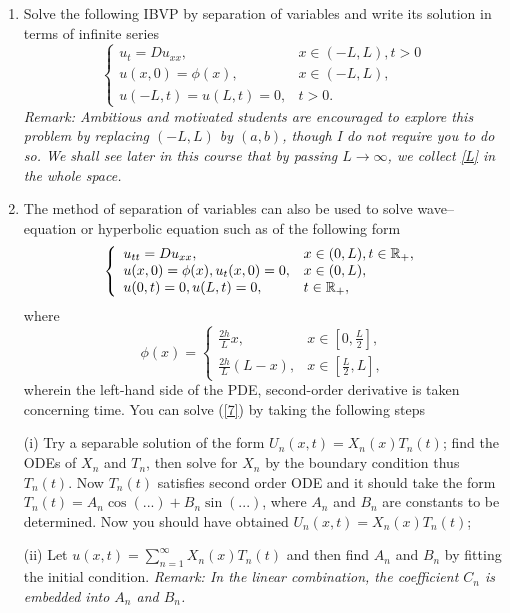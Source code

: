 \documentclass[6pt]{article}
\numberwithin{equation}{section}
\def\mathbb{\Bbb}
\begin{document}
\begin{enumerate}
\item Solve the following IBVP by separation of variables and write its solution in terms of infinite series
\begin{equation}\label{L}
\left\{
\begin{array}{ll}
u_t=Du_{xx},& x\in(-L,L),t>0\\
u(x,0)=\phi(x),&x\in(-L,L),\\
u(-L,t)=u(L,t)=0, &t>0.
\end{array}
\right.
\end{equation}
\emph{Remark:  Ambitious and motivated students are encouraged to explore this problem by replacing $(-L,L)$ by $(a,b)$, though I do not require you to do so.  We shall see later in this course that by passing $L\rightarrow\infty$, we collect \eqref{L} in the whole space.}

\item  The method of separation of variables can also be used to solve wave--equation or hyperbolic equation such as of the following form
\begin{equation}\label{7}
\left\{
\begin{array}{ll}
u_{tt}=Du_{xx},& x\in(0,L),t\in \mathbb R_+,\\
u(x,0)=\phi(x), u_t(x,0)=0, &x\in(0,L),\\
u(0,t)=0, u(L,t)=0, &t\in \mathbb R_+,
\end{array}
\right.
\end{equation}
where
\[\phi(x)=
\left\{
\begin{array}{ll}
\frac{2h}{L}x, &x\in[0,\frac{L}{2}],\\
\frac{2h}{L}(L-x),& x\in[\frac{L}{2},L],
\end{array}
\right.
\]
wherein the left-hand side of the PDE, second-order derivative is taken concerning time.  You can solve (\ref{7}) by taking the following steps

(i)  Try a separable solution of the form $U_n(x,t)=X_n(x)T_n(t)$;  find the ODEs of $X_n$ and $T_n$, then solve for $X_n$ by the boundary condition thus $T_n(t)$.  Now $T_n(t)$ satisfies second order ODE and it should take the form $T_n(t)=A_n \cos(...)+B_n\sin (...)$, where $A_n$ and $B_n$ are constants to be determined.  Now you should have obtained $U_n(x,t)=X_n(x)T_n(t)$;

(ii) Let $u(x,t)=\sum^\infty_{n=1}X_n(x)T_n(t)$ and then find $A_n$ and $B_n$ by fitting the initial condition.  \emph{Remark:  In the linear combination, the coefficient $C_n$ is embedded into $A_n$ and $B_n$.}


\end{enumerate}
\end{document}
